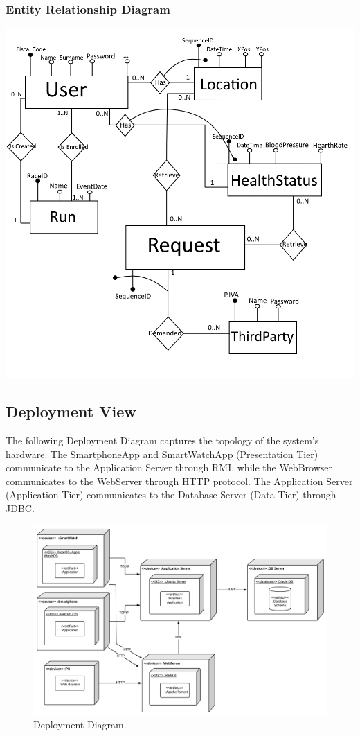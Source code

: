 \subsubsection{Entity Relationship Diagram}

\includegraphics[scale=0.5]{Images/ERDiagram.png}


\subsection{Deployment View}
The following Deployment Diagram captures the topology of the system's hardware.
The SmartphoneApp and SmartWatchApp (Presentation Tier) communicate to the Application Server through RMI, while the WebBrowser communicates to the WebServer through HTTP protocol. The Application Server (Application Tier) communicates to the Database Server (Data Tier) through JDBC.

\begin{figure}[H]
\centering
\includegraphics[scale=0.13]{Images/DeploymentDiagram.png}
\caption{Deployment Diagram.}
\end{figure}

